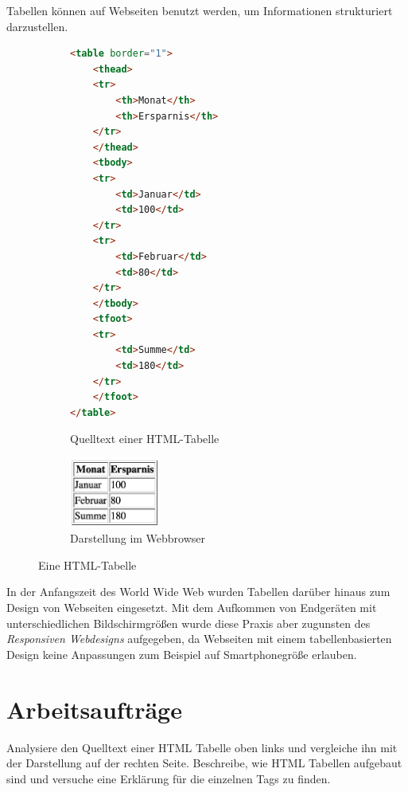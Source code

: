 \documentclass[10pt, a4paper]{arbeitsblatt}
\begin{document}
\ReiheTitel

Tabellen können auf Webseiten benutzt werden, um Informationen
strukturiert darzustellen.

\begin{figure}[ht]
	\begin{subfigure}[b]{.5\linewidth}
		\begin{lstlisting}[language=HTML]
<table border="1">
	<thead>
	<tr>
		<th>Monat</th>
		<th>Ersparnis</th>
	</tr>
	</thead>
	<tbody>
	<tr>
		<td>Januar</td>
		<td>100</td>
	</tr>
	<tr>
		<td>Februar</td>
		<td>80</td>
	</tr>
	</tbody>
	<tfoot>
	<tr>
		<td>Summe</td>
		<td>180</td>
	</tr>
	</tfoot>
</table>
		\end{lstlisting}
		\caption{Quelltext einer HTML-Tabelle}\label{lst:tabelle}
	\end{subfigure}%
	\begin{subfigure}[b]{.5\linewidth}\centering
		\includegraphics[width=3cm]{8Diff-AB.5-Abb_Tabelle.png}
		\caption{Darstellung im Webbrowser}\label{abb:tabelle-render}
	\end{subfigure}
	\caption{Eine HTML-Tabelle}\label{abb:tabelle}
\end{figure}

\begin{rahmen}\small
	In der Anfangszeit des World Wide Web wurden Tabellen darüber hinaus
	zum Design von Webseiten eingesetzt. Mit dem Aufkommen von Endgeräten
	mit unterschiedlichen Bildschirmgrößen wurde diese Praxis aber zugunsten
	des \emph{Responsiven Webdesigns} aufgegeben, da Webseiten mit einem
	tabellenbasierten Design keine Anpassungen zum Beispiel auf
	Smartphonegröße erlauben.
\end{rahmen}

\section*{Arbeitsaufträge}
\begin{aufgabe}[icon=\iconHeft]
	Analysiere den Quelltext einer HTML Tabelle oben links und vergleiche
	ihn mit der Darstellung auf der rechten Seite. Beschreibe, wie HTML
	Tabellen aufgebaut sind und versuche eine Erklärung für die einzelnen
	Tags zu finden.
\end{aufgabe}
\end{document}
